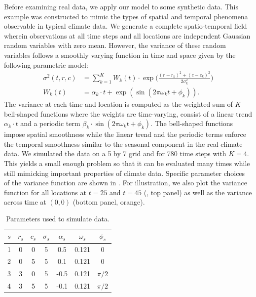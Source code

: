 \documentclass[letterpaper]{article} %
\newcommand{\autoref}{\Cref}
\begin{document}
Before examining real data, we apply our model to some synthetic
data. This example was constructed to mimic the types of spatial and
temporal phenomena observable in typical climate data. We generate a
complete spatio-temporal field wherein 
observations at all time steps and all locations are
independent Gaussian random variables with zero mean. However, the
variance of these random variables follows a smoothly varying function
in time and space given by the following parametric model:
\begin{align}
  \sigma^2(t,r,c) & =\sum_{k=1}^{K} W_k(t) \cdot \exp\bigg(
                    \frac{(r-r_k)^2+(c-c_k)^2} {2\sigma_k^2} \bigg)\\
  W_k(t) & =\alpha_k \cdot t + \exp(\sin(2\pi\omega_k t+\phi_k)) .
\label{eq:sourceVar}
\end{align}
The variance at each time and location is computed as the
weighted sum of $K$ bell-shaped functions where the weights are
time-varying, consist of a linear trend $\alpha_k \cdot t$ and a
periodic term $\beta_k \cdot \sin(2\pi\omega_k t+\phi_k)$. The
bell-shaped functions impose spatial smoothness while the linear
trend and the periodic terms enforce the temporal smoothness similar
to the seasonal component in the real climate data. We simulated the
data on a 5 by 7 grid and for 780 time steps with $K=4$. This yields a
small enough problem so that it can be evaluated many times while
still mimicking important properties of climate data.
Specific parameter choices of the variance function are shown in
\autoref{tab:sim_params}.
For illustration, we also plot the
variance function for all locations at $t=25$ and $t=45$
(\autoref{fig:true_var_spatial}, top panel) as well as
the variance across time at $(0,0)$ (bottom panel, orange).
\begin{table}[tb]
  \caption{Parameters used to simulate data.}
  \label{tab:sim_params}
  \begin{center}
    \begin{tabular}{ccccccc}
      \hline
      $s$ & $r_s$ & $c_s$ & $\sigma_s$ &$\alpha_s$ & $\omega_s$ & $\phi_s$\\
      \hline
      1 & 0 & 0 & 5 & 0.5 & 0.121 & 0 \\
      2 & 0 & 5 & 5 & 0.1 & 0.121 & 0 \\
      3 & 3 & 0 & 5 & -0.5 & 0.121 & $\pi/2$ \\
      4 & 3 & 5 & 5 & -0.1 & 0.121 & $\pi/2$ \\
      \hline
    \end{tabular}
  \end{center}
\end{table} 
\end{document}
